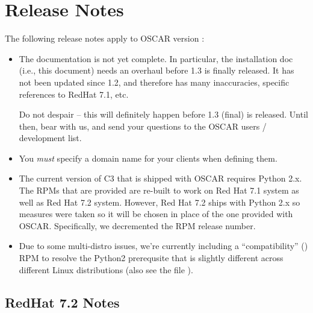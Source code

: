 %
%
%

\section{Release Notes}

The following release notes apply to OSCAR version \oscarversion:

\begin{itemize}
\item The documentation is not yet complete.  In particular, the
  installation doc (i.e., this document) needs an overhaul before 1.3
  is finally released.  It has not been updated since 1.2, and
  therefore has many inaccuracies, specific references to RedHat 7.1,
  etc.
  
  Do not despair -- this will definitely happen before 1.3 (final) is
  released.  Until then, bear with us, and send your questions to the
  OSCAR users / development list.
  
\item You {\em must} specify a domain name for your clients when
  defining them.
  
\item The current version of C3 that is shipped with OSCAR requires
  Python 2.x.  The RPMs that are provided are re-built to work on Red
  Hat 7.1 system as well as Red Hat 7.2 system.  However, Red Hat 7.2
  ships with Python 2.x so measures were taken so it will be chosen in
  place of the one provided with OSCAR.  Specifically, we decremented
  the RPM release number.
  
\item Due to some multi-distro issues, we're currently including a
  ``compatibility'' () RPM to resolve the
  Python2 prerequsite that is slightly different across different
  Linux distributions (also see the file
  ).
\end{itemize}


\subsection{RedHat 7.2 Notes}

